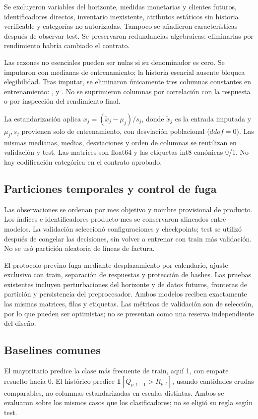 Se excluyeron variables del horizonte, medidas monetarias y clientes futuros, identificadores directos, inventario inexistente, atributos estáticos sin historia verificable y categorías no autorizadas. Tampoco se añadieron características después de observar test. Se preservaron redundancias algebraicas: eliminarlas por rendimiento habría cambiado el contrato.

Las razones no esenciales pueden ser nulas si su denominador es cero. Se imputaron con medianas de entrenamiento; la historia esencial ausente bloquea elegibilidad. Tras imputar, se eliminaron únicamente tres columnas constantes en entrenamiento: ,  y . No se suprimieron columnas por correlación con la respuesta o por inspección del rendimiento final.

La estandarización aplica $x_j=(\widetilde x_j-\mu_j)/s_j$, donde $\widetilde x_j$ es la entrada imputada y $\mu_j,s_j$ provienen solo de entrenamiento, con desviación poblacional ($ddof=0$). Las mismas medianas, medias, desviaciones y orden de columnas se reutilizan en validación y test. Las matrices son float64 y las etiquetas int8 canónicas 0/1. No hay codificación categórica en el contrato aprobado.

\subsection{Particiones temporales y control de fuga}

Las observaciones se ordenan por mes objetivo y nombre provisional de producto. Los índices e identificadores producto-mes se conservaron alineados entre modelos. La validación seleccionó configuraciones y checkpoints; test se utilizó después de congelar las decisiones, sin volver a entrenar con train más validación. No se usó partición aleatoria de líneas de factura.

El protocolo previno fuga mediante desplazamiento por calendario, ajuste exclusivo con train, separación de respuestas y protección de hashes. Las pruebas existentes incluyen perturbaciones del horizonte y de datos futuros, fronteras de partición y persistencia del preprocesador. Ambos modelos reciben exactamente las mismas matrices, filas y etiquetas. Las métricas de validación son de selección, por lo que pueden ser optimistas; no se presentan como una reserva independiente del diseño.

\subsection{Baselines comunes}
El mayoritario predice la clase más frecuente de train, aquí 1, con empate resuelto hacia 0. El histórico predice $\mathbf1[Q_{p,t-1}>R_{p,t}]$, usando cantidades crudas comparables, no columnas estandarizadas en escalas distintas. Ambos se evaluaron sobre los mismos casos que los clasificadores; no se eligió su regla según test.
